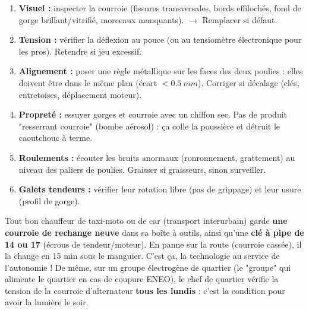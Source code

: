 \documentclass[11pt]{article}
\begin{document}
\begin{methode}
\begin{enumerate}
\item \textbf{Visuel :} inspecter la courroie (fissures transversales, bords effilochés, fond de gorge brillant/vitrifié, morceaux manquants). $\rightarrow$ Remplacer si défaut.
\item \textbf{Tension :} vérifier la déflexion au pouce (ou au tensiomètre électronique pour les pros). Retendre si jeu excessif.
\item \textbf{Alignement :} poser une règle métallique sur les faces des deux poulies : elles doivent être dans le même plan (écart $< \SI{0,5}{mm}$). Corriger si décalage (clés, entretoises, déplacement moteur).
\item \textbf{Propreté :} essuyer gorges et courroie avec un chiffon sec. Pas de produit "resserrant courroie" (bombe aérosol) : ça colle la poussière et détruit le caoutchouc à terme.
\item \textbf{Roulements :} écouter les bruits anormaux (ronronnement, grattement) au niveau des paliers de poulies. Graisser si graisseurs, sinon surveiller.
\item \textbf{Galets tendeurs :} vérifier leur rotation libre (pas de grippage) et leur usure (profil de gorge).
\end{enumerate}
\end{methode}

\begin{savaistu}
Tout bon chauffeur de taxi-moto ou de car (transport interurbain) garde \textbf{une courroie de rechange neuve} dans sa boîte à outils, ainsi qu'une \textbf{clé à pipe de 14 ou 17} (écrous de tendeur/moteur). En panne sur la route (courroie cassée), il la change en 15 min sous le manguier. C'est ça, la technologie au service de l'autonomie ! De même, sur un groupe électrogène de quartier (le "groupe" qui alimente le quartier en cas de coupure ENEO), le chef de quartier vérifie la tension de la courroie d'alternateur \textbf{tous les lundis} : c'est la condition pour avoir la lumière le soir.
\end{savaistu}
\end{document}
